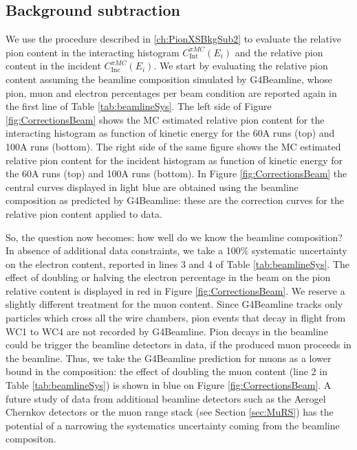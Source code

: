 \subsection{Background subtraction}\label{ch:BKGsubXSPuppa}
We use the procedure described in \ref{ch:PionXSBkgSub2} to evaluate the relative pion content in the interacting histogram $C^{\pi MC}_{\text{Int}} (E_{i})$  and the relative pion content in the incident $C^{\pi MC}_{\text{Inc}} (E_{i})$. We start by evaluating the relative pion content assuming the beamline composition simulated by G4Beamline, whose pion, muon and electron percentages per beam condition are reported again in the first line of Table \ref{tab:beamlineSys}. The left side of Figure \ref{fig:CorrectionsBeam} shows the  MC estimated  relative pion content for the interacting histogram as function of kinetic energy for the 60A runs (top) and 100A runs (bottom). The right side of the same figure shows the  MC estimated  relative pion content for the incident histogram as function of kinetic energy for the 60A runs (top) and 100A runs (bottom). In Figure \ref{fig:CorrectionsBeam} the central curves displayed in light blue are obtained using the beamline composition as predicted by G4Beamline: these are the correction curves for the relative pion content applied to data.

So, the question now becomes: how well do we know the beamline composition? In absence of additional data constraints,  we take a 100\% systematic uncertainty on the electron content, reported in lines 3 and 4 of Table \ref{tab:beamlineSys}. The effect of doubling or halving the electron percentage in the beam on the pion relative content is displayed in red in Figure \ref{fig:CorrectionsBeam}. We reserve a slightly different treatment for the muon content. Since G4Beamline tracks only particles which cross all the wire chambers, pion events that decay in flight from WC1 to WC4 are not recorded by G4Beamline. Pion decays in the beamline could be trigger the beamline detectors in data, if the produced muon proceeds in the beamline. Thus, we take the G4Beamline prediction for muons as a lower bound in the composition: the effect of doubling the muon content (line 2 in Table \ref{tab:beamlineSys}) is shown in blue on Figure \ref{fig:CorrectionsBeam}. A future study of data from additional beamline detectors such as the Aerogel Chernkov detectors \cite{detectorPaper} or the muon range stack (see Section \ref{sec:MuRS}) has the potential of a narrowing the systematics uncertainty coming from the beamline compositon.


